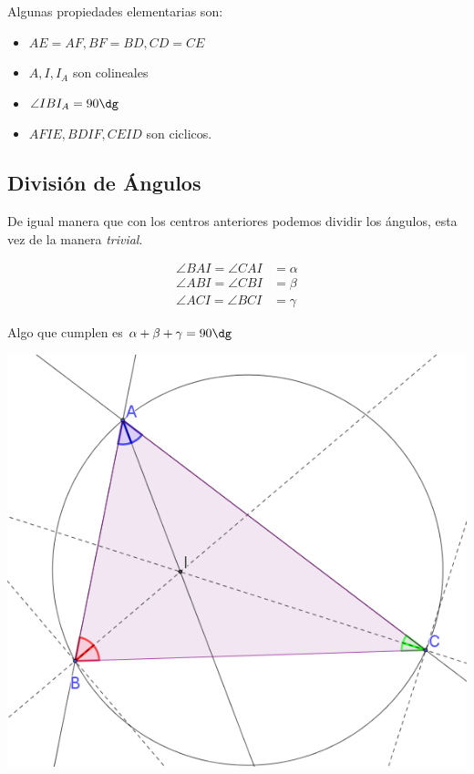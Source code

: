 \documentclass[11pt]{scrartcl}
\begin{document}
Algunas propiedades elementarias son:

\begin{itemize}
    \item $AE=AF, BF=BD, CD=CE$
    \item $A, I, I_A$ son colineales
    \item $\angle IBI_A=90\dg$
    \item $AFIE, BDIF, CEID$ son ciclicos.
\end{itemize}

\subsection{Divisi\'on de \'Angulos}

De igual manera que con los centros anteriores podemos dividir los \'angulos, esta vez de la manera \textit{trivial}.

\begin{align*}
    \angle BAI=\angle CAI &= \alpha \\
    \angle ABI= \angle CBI &= \beta \\
    \angle ACI= \angle BCI &= \gamma
\end{align*}



Algo que cumplen es $\alpha+\beta+\gamma=90\dg$

\begin{center}
        \includegraphics[scale=0.4]{PNAC13.png}
    \end{center}
\end{document}
